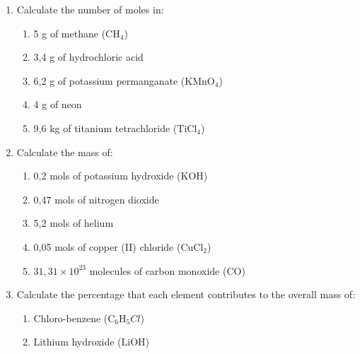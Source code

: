 \begin{enumerate}[noitemsep, label=\textbf{\arabic*}. ]
\begin{enumerate}[noitemsep, label=\textbf{\alph*}. ]
\begin{enumerate}[noitemsep, label=\textbf{\alph*}. ]
\end{enumerate}
                \end{enumerate}
        \item Calculate the number of moles in:
\label{m38712*id6342}\begin{enumerate}[noitemsep, label=\textbf{\alph*}. ] 
            \item 5 g of methane (\begin{math}{\mathrm{CH}}_{4}\end{math})\item 3,4 g of hydrochloric acid\item 6,2 g of potassium permanganate (\begin{math}{\mathrm{KMnO}}_{4}\end{math})\item 4 g of neon\item 9,6 kg of titanium tetrachloride (\begin{math}{\mathrm{TiCl}}_{4}\end{math})\end{enumerate}
        
        \item Calculate the mass of:\label{m38712*id7342}\begin{enumerate}[noitemsep, label=\textbf{\alph*}. ] 
            \item 0,2 mols of potassium hydroxide (\begin{math}\mathrm{KOH}\end{math})\item 0,47 mols of nitrogen dioxide\item 5,2 mols of helium\item 0,05 mols of copper (II) chloride (\begin{math}{\mathrm{CuCl}}_{2}\end{math})\item \begin{math}31,31\ensuremath{\times}{10}^{23}\end{math} molecules of carbon monoxide (\begin{math}\mathrm{CO}\end{math})\end{enumerate}
                
\item Calculate the percentage that each element contributes to the overall mass of:
\label{m38712*id6334}\begin{enumerate}[noitemsep, label=\textbf{\alph*}. ] 
            \item Chloro-benzene (\begin{math}{\mathrm{C}}_{6}{\mathrm{H}}_{5}Cl\end{math})\item Lithium hydroxide (\begin{math}\mathrm{LiOH}\end{math})\end{enumerate}
                

\end{enumerate}
